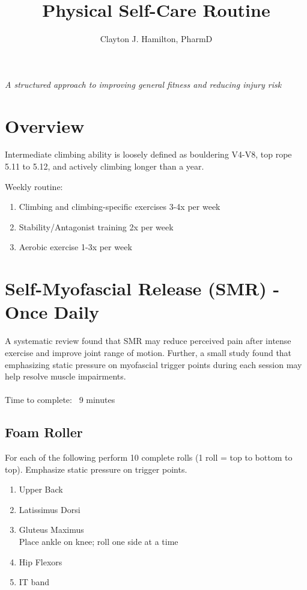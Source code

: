 \documentclass[12pt, letterpaper]{article}
\title{Physical Self-Care Routine}
\author{Clayton J. Hamilton, PharmD}
\date{}
\begin{document}
\maketitle

\centerline{\textit{A structured approach to improving general fitness and reducing injury risk}}

\tableofcontents

\newpage %


\section{Overview}

Intermediate climbing ability is loosely defined as bouldering V4-V8, top rope 5.11 to 5.12, and actively climbing longer than a year.

Weekly routine:
\begin{enumerate}
      \item Climbing and climbing-specific exercises 3-4x per week
      \item Stability/Antagonist training 2x per week
      \item Aerobic exercise 1-3x per week
  \end{enumerate}

\newpage %


\section{Self-Myofascial Release (SMR) - Once Daily}

A systematic review found that SMR may reduce perceived pain after 
intense exercise and improve joint range of motion.\cite{pmid26618062} Further, a small study found that
 emphasizing static pressure on myofascial trigger points during each session may help resolve muscle impairments.\cite{pmid30765920} 
 \\
 \\
Time to complete: ~9 minutes

\subsection{Foam Roller}

For each of the following perform 10 complete rolls (1 roll = top to bottom to top). Emphasize static pressure on trigger points.
\begin{enumerate}
    \item Upper Back
    \item Latissimus Dorsi
    \item Gluteus Maximus \\ Place ankle on knee; roll one side at a time
    \item Hip Flexors
    \item IT band
\end{enumerate}
\end{document}
